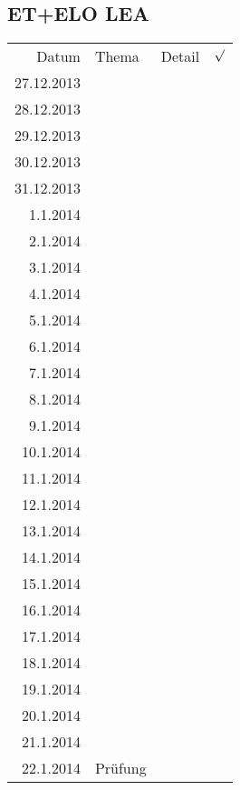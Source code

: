 \subsection{ET+ELO LEA}
\begin{tabular}{r l p{} l}
\rowcolor{lgray} Datum       & Thema         & Detail & $\surd$ \\
\rowcolor{white}  27.12.2013 &               &  &  \\
\rowcolor{lgray}  28.12.2013 &               &  &  \\
\rowcolor{white}  29.12.2013 &               &  &  \\
\rowcolor{lgray}  30.12.2013 &               &  &  \\
\rowcolor{white}  31.12.2013 &               &  &  \\
\rowcolor{lgray}    1.1.2014 &               &  &  \\
\rowcolor{white}    2.1.2014 &               &  &  \\
\rowcolor{lgray}    3.1.2014 &               &  &  \\
\rowcolor{white}    4.1.2014 &               &  &  \\
\rowcolor{lgray}    5.1.2014 &               &  &  \\
\rowcolor{white}    6.1.2014 &               &  &  \\
\rowcolor{lgray}    7.1.2014 &               &  &  \\
\rowcolor{white}    8.1.2014 &               &  &  \\
\rowcolor{lgray}    9.1.2014 &               &  &  \\
\rowcolor{white}   10.1.2014 &               &  &  \\
\rowcolor{lgray}   11.1.2014 &               &  &  \\
\rowcolor{white}   12.1.2014 &               &  &  \\
\rowcolor{lgray}   13.1.2014 &               &  &  \\
\rowcolor{white}   14.1.2014 &               &  &  \\
\rowcolor{lgray}   15.1.2014 &               &  &  \\
\rowcolor{white}   16.1.2014 &               &  &  \\
\rowcolor{lgray}   17.1.2014 &               &  &  \\
\rowcolor{white}   18.1.2014 &               &  &  \\
\rowcolor{lgray}   19.1.2014 &               &  &  \\
\rowcolor{white}   20.1.2014 &               &  &  \\
\rowcolor{lgray}   21.1.2014 &               &  &  \\
\rowcolor{white}   22.1.2014 & Prüfung       &  &  \\
\end{tabular}

